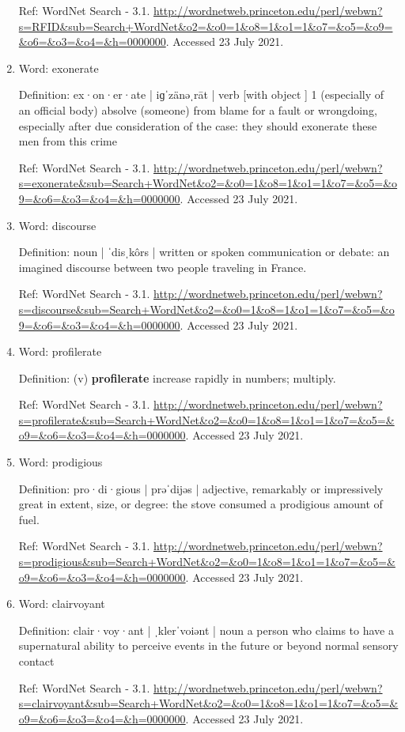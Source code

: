 \documentclass{scrartcl}
\begin{document}
\begin{enumerate}
Ref: WordNet Search - 3.1. \url{http://wordnetweb.princeton.edu/perl/webwn?s=RFID\&sub=Search+WordNet\&o2=\&o0=1\&o8=1\&o1=1\&o7=\&o5=\&o9=\&o6=\&o3=\&o4=\&h=0000000}. Accessed 23 July 2021.

\item Word: exonerate

Definition:  ex·on·er·ate | iɡˈzänəˌrāt | verb [with object ] 1 (especially of an official body) absolve (someone) from blame for a fault or wrongdoing, especially after due consideration of the case: they should exonerate these men from this crime

Ref: WordNet Search - 3.1. \url{http://wordnetweb.princeton.edu/perl/webwn?s=exonerate\&sub=Search+WordNet\&o2=\&o0=1\&o8=1\&o1=1\&o7=\&o5=\&o9=\&o6=\&o3=\&o4=\&h=0000000}. Accessed 23 July 2021.

\item Word: discourse

 Definition: noun | ˈdisˌkôrs | written or spoken communication or debate: an imagined discourse between two people
traveling in France.

Ref: WordNet Search - 3.1. \url{http://wordnetweb.princeton.edu/perl/webwn?s=discourse\&sub=Search+WordNet\&o2=\&o0=1\&o8=1\&o1=1\&o7=\&o5=\&o9=\&o6=\&o3=\&o4=\&h=0000000}. Accessed 23 July 2021.

\item Word: profilerate

Definition: (v)  \textbf{profilerate} increase rapidly in numbers; multiply.

Ref: WordNet Search - 3.1.
\url{http://wordnetweb.princeton.edu/perl/webwn?s=profilerate\&sub=Search+WordNet\&o2=\&o0=1\&o8=1\&o1=1\&o7=\&o5=\&o9=\&o6=\&o3=\&o4=\&h=0000000}. Accessed 23 July 2021.

\item Word: prodigious

Definition: pro·di·gious | prəˈdijəs | adjective, remarkably or impressively great in extent, size, or degree: the stove consumed a prodigious amount of fuel.

Ref: WordNet Search - 3.1.
\url{http://wordnetweb.princeton.edu/perl/webwn?s=prodigious\&sub=Search+WordNet\&o2=\&o0=1\&o8=1\&o1=1\&o7=\&o5=\&o9=\&o6=\&o3=\&o4=\&h=0000000}. Accessed 23 July 2021.

\item Word: clairvoyant

Definition: clair·voy·ant | ˌklerˈvoiənt | noun a person who claims to have a supernatural ability to perceive events in the future or beyond normal sensory contact

Ref: WordNet Search - 3.1.
\url{http://wordnetweb.princeton.edu/perl/webwn?s=clairvoyant\&sub=Search+WordNet\&o2=\&o0=1\&o8=1\&o1=1\&o7=\&o5=\&o9=\&o6=\&o3=\&o4=\&h=0000000}. Accessed 23 July 2021.
\end{enumerate}
\end{document}
